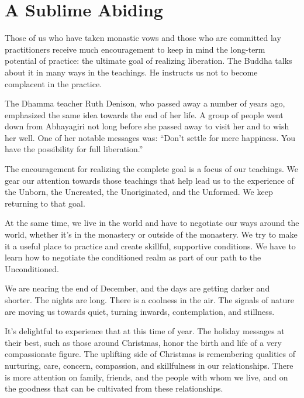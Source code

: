 
\chapter{A Sublime Abiding}

Those of us who have taken monastic vows and those who are committed lay practitioners receive much encouragement to keep in mind the long-term potential of practice: the ultimate goal of realizing liberation. The Buddha talks about it in many ways in the teachings. He instructs us not to become complacent in the practice.

The Dhamma teacher Ruth Denison, who passed away a number of years ago, emphasized the same idea towards the end of her life. A group of people went down from Abhayagiri not long before she passed away to visit her and to wish her well. One of her notable messages was: ``Don't settle for mere happiness. You have the possibility for full liberation.''

The encouragement for realizing the complete goal is a focus of our teachings. We gear our attention towards those teachings that help lead us to the experience of the Unborn, the Uncreated, the Unoriginated, and the Unformed. We keep returning to that goal.

At the same time, we live in the world and have to negotiate our ways around the world, whether it's in the monastery or outside of the monastery. We try to make it a useful place to practice and create skillful, supportive conditions. We have to learn how to negotiate the conditioned realm as part of our path to the Unconditioned.

We are nearing the end of December, and the days are getting darker and shorter. The nights are long. There is a coolness in the air. The signals of nature are moving us towards quiet, turning inwards, contemplation, and stillness.

It's delightful to experience that at this time of year. The holiday messages at their best, such as those around Christmas, honor the birth and life of a very compassionate figure. The uplifting side of Christmas is remembering qualities of nurturing, care, concern, compassion, and skillfulness in our relationships. There is more attention on family, friends, and the people with whom we live, and on the goodness that can be cultivated from these relationships.


